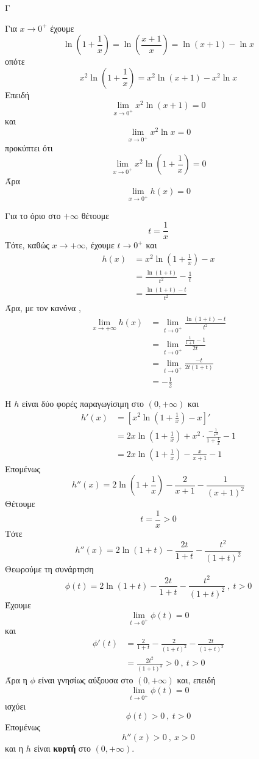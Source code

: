 \begin{thema}{Γ}
\begin{erwthma}
\item Για $x\to 0^+$ έχουμε
\[\ln\left(1+\frac{1}{x}\right)=\ln\left(\frac{x+1}{x}\right)=\ln(x+1)-\ln x\]
οπότε
\[x^2\ln\left(1+\frac{1}{x}\right)=x^2\ln(x+1)-x^2\ln x\]
Επειδή
\[\lim\limits_{x\to 0^+}x^2\ln(x+1)=0\]
και
\[\lim\limits_{x\to 0^+}x^2\ln x=0\]
προκύπτει ότι
\[\lim\limits_{x\to 0^+}x^2\ln\left(1+\frac{1}{x}\right)=0\]
Άρα
\[\lim\limits_{x\to 0^+}h(x)=0\]

Για το όριο στο $+\infty$ θέτουμε
\[t=\frac{1}{x}\]
Τότε, καθώς $x\to+\infty$, έχουμε $t\to 0^+$ και
\begin{align*}
h(x)&=x^2\ln\left(1+\frac{1}{x}\right)-x\\
&=\frac{\ln(1+t)}{t^2}-\frac{1}{t}\\
&=\frac{\ln(1+t)-t}{t^2}
\end{align*}
Άρα, με τον κανόνα ,
\begin{align*}
\lim\limits_{x\to+\infty}h(x)
&=\lim\limits_{t\to 0^+}\frac{\ln(1+t)-t}{t^2}\\
&=\lim\limits_{t\to 0^+}\frac{\frac{1}{1+t}-1}{2t}\\
&=\lim\limits_{t\to 0^+}\frac{-t}{2t(1+t)}\\
&=-\frac{1}{2}
\end{align*}

\item Η $h$ είναι δύο φορές παραγωγίσιμη στο $(0,+\infty)$ και
\begin{align*}
h'(x)&=\left[x^2\ln\left(1+\frac{1}{x}\right)-x\right]'\\
&=2x\ln\left(1+\frac{1}{x}\right)+x^2\cdot\frac{-\frac{1}{x^2}}{1+\frac{1}{x}}-1\\
&=2x\ln\left(1+\frac{1}{x}\right)-\frac{x}{x+1}-1
\end{align*}
Επομένως
\[h''(x)=2\ln\left(1+\frac{1}{x}\right)-\frac{2}{x+1}-\frac{1}{(x+1)^2}\]
Θέτουμε
\[t=\frac{1}{x}>0\]
Τότε
\[h''(x)=2\ln(1+t)-\frac{2t}{1+t}-\frac{t^2}{(1+t)^2}\]
Θεωρούμε τη συνάρτηση
\[\phi(t)=2\ln(1+t)-\frac{2t}{1+t}-\frac{t^2}{(1+t)^2}\ ,\ t>0\]
Έχουμε
\[\lim\limits_{t\to 0^+}\phi(t)=0\]
και
\begin{align*}
\phi'(t)&=\frac{2}{1+t}-\frac{2}{(1+t)^2}-\frac{2t}{(1+t)^3}\\
&=\frac{2t^2}{(1+t)^3}>0\ ,\ t>0
\end{align*}
Άρα η $\phi$ είναι γνησίως αύξουσα στο $(0,+\infty)$ και, επειδή
\[\lim\limits_{t\to 0^+}\phi(t)=0\]
ισχύει
\[\phi(t)>0\ ,\ t>0\]
Επομένως
\[h''(x)>0\ ,\ x>0\]
και η $h$ είναι \textbf{κυρτή} στο $(0,+\infty)$.


\end{erwthma}
\end{thema}
